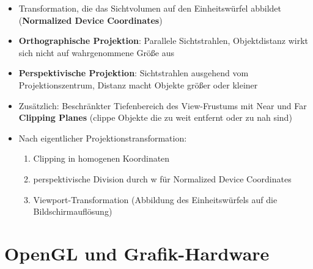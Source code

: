 \documentclass[10pt,a4paper]{article}
\begin{document}
	\begin{itemize}
		\item Transformation, die das Sichtvolumen auf den Einheitswürfel abbildet (\textbf{Normalized Device Coordinates})
		\item \textbf{Orthographische Projektion}: Parallele Sichtstrahlen, Objektdistanz wirkt sich nicht auf wahrgenommene Größe aus
		\item \textbf{Perspektivische Projektion}: Sichtstrahlen ausgehend vom Projektionszentrum, Distanz macht Objekte größer oder kleiner
		\item Zusätzlich: Beschränkter Tiefenbereich des View-Frustums mit Near und Far \textbf{Clipping Planes} (clippe Objekte die zu weit entfernt oder zu nah sind)
		\item Nach eigentlicher Projektionstransformation:
		\begin{enumerate}
			\item Clipping in homogenen Koordinaten
			\item perspektivische Division durch w für Normalized Device Coordinates
			\item Viewport-Transformation (Abbildung des Einheitswürfels auf die Bildschirmauflösung)
		\end{enumerate}
	\end{itemize}

	\newpage
	\section{OpenGL und Grafik-Hardware}
	\label{sec:opengl_und_grafik_hardware}
\end{document}
